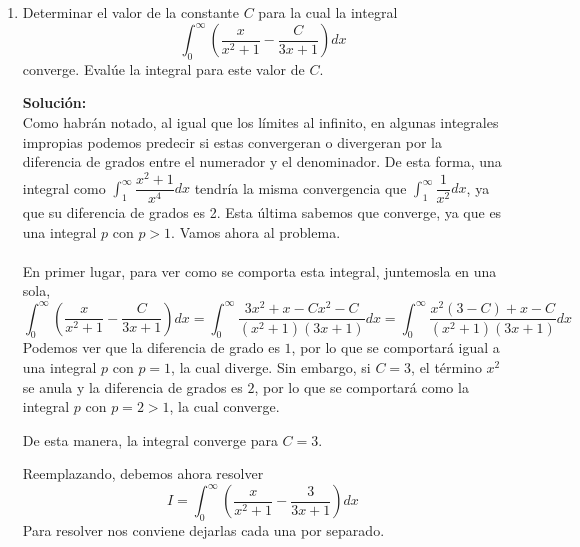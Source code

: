 \documentclass[12pt]{article}
\newenvironment{solucion}
{\begin{mdframed}[backgroundcolor=black!10]
		{\bf Solución:}\\
	}
	{
	\end{mdframed}
}
\newenvironment{preguntas}
{\begin{enumerate}\itemsep12pt
	}
	{
	\end{enumerate}
}
\newcommand{\ev}{\Big|}
\newcommand{\ra}{\rightarrow}
\begin{document}
\begin{preguntas}
\begin{solucion}
\begin{enumerate}[a)]
			$$ V = \pi \displaystyle\int_{1}^{L} f(x)^2dx, \quad con\ L \ra \infty$$
			Usando la fórmula dada,
			$$V = \pi \displaystyle\int_{1}^{\infty} \left(\dfrac{1}{x}\right)^2dx
			=  \pi \displaystyle\int_{1}^{\infty} \dfrac{1}{x^2}dx
			= \pi \left(-\dfrac{1}{x}\ev_1^{\infty}\right)$$
			$$V = \pi$$
\end{enumerate}
\end{solucion}
\item Determinar el valor de la constante $C$ para la cual la integral
	$$\displaystyle\int_{0}^{\infty} \left( \dfrac{x}{x^2+1} - \dfrac{C}{3x+1}\right)dx$$
	converge. Evalúe la integral para este valor de $C$.
\begin{solucion}
Como habrán notado, al igual que los límites al infinito, en algunas integrales impropias podemos predecir si estas convergeran o divergeran por la diferencia de grados entre el numerador y el denominador. De esta forma, una integral como $\displaystyle\int_1^{\infty} \dfrac{x^2+1}{x^4}dx$ tendría la misma convergencia que $\displaystyle\int_1^{\infty} \dfrac{1}{x^2}dx$, ya que su diferencia de grados es 2. Esta última sabemos que converge, ya que es una integral $p$ con $p>1$. Vamos ahora al problema.\\
		\\
		En primer lugar, para ver como se comporta esta integral, juntemosla en una sola,
		\small$$\displaystyle\int_{0}^{\infty} \left( \dfrac{x}{x^2+1} - \dfrac{C}{3x+1}\right)dx
		= \displaystyle\int_{0}^{\infty} \dfrac{3x^2+x-Cx^2-C}{(x^2+1)(3x+1)}dx
		= \displaystyle\int_{0}^{\infty} \dfrac{x^2(3-C) + x - C}{(x^2+1)(3x+1)}dx$$
		Podemos ver que la diferencia de grado es $1$, por lo que se comportará igual a una integral $p$ con $p=1$, la cual diverge. Sin embargo, si $C=3$, el término $x^2$ se anula y la diferencia de grados es $2$, por lo que se comportará como la integral $p$ con $p=2>1$, la cual converge.
		
		De esta manera, la integral converge para $C=3$.
		
		Reemplazando, debemos ahora resolver
		$$I = \displaystyle\int_{0}^{\infty} \left( \dfrac{x}{x^2+1} - \dfrac{3}{3x+1}\right)dx$$
		Para resolver nos conviene dejarlas cada una por separado.
		

\end{solucion}
\end{preguntas}
\end{document}

